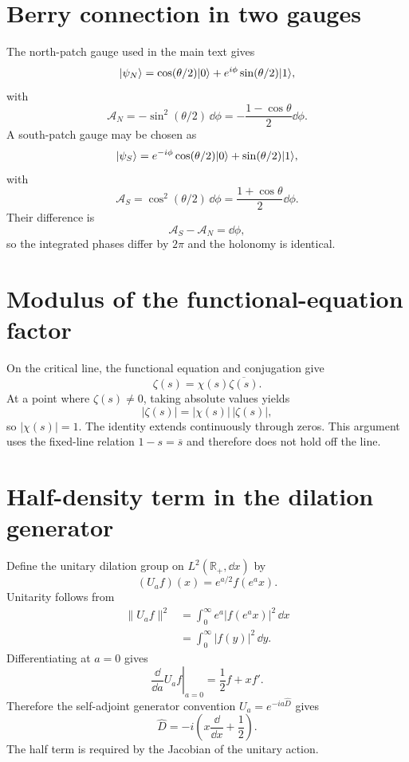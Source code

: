\section{Berry connection in two gauges}
The north-patch gauge used in the main text gives
\begin{equation}
\lvert \psi_N\rangle
=\cos(\theta/2)\lvert 0\rangle+e^{i\phi}\sin(\theta/2)\lvert 1\rangle,
\end{equation}
with
\begin{equation}
\mathcal A_N=-\sin^2(\theta/2)\,\dd\phi
=-\frac{1-\cos\theta}{2}\dd\phi.
\end{equation}
A south-patch gauge may be chosen as
\begin{equation}
\lvert \psi_S\rangle=e^{-i\phi}\cos(\theta/2)\lvert 0\rangle+\sin(\theta/2)\lvert 1\rangle,
\end{equation}
with
\begin{equation}
\mathcal A_S=\cos^2(\theta/2)\,\dd\phi
=\frac{1+\cos\theta}{2}\dd\phi.
\end{equation}
Their difference is
\begin{equation}
\mathcal A_S-\mathcal A_N=\dd\phi,
\end{equation}
so the integrated phases differ by $2\pi$ and the holonomy is identical.

\section{Modulus of the functional-equation factor}
On the critical line, the functional equation and conjugation give
\begin{equation}
\zeta(s)=\chi(s)\overline{\zeta(s)}.
\end{equation}
At a point where $\zeta(s)\neq0$, taking absolute values yields
\begin{equation}
|\zeta(s)|=|\chi(s)|\,|\zeta(s)|,
\end{equation}
so $|\chi(s)|=1$. The identity extends continuously through zeros. This argument uses the fixed-line relation $1-s=\overline s$ and therefore does not hold off the line.

\section{Half-density term in the dilation generator}
Define the unitary dilation group on $L^2(\mathbb R_+,\dd x)$ by
\begin{equation}
(U_a f)(x)=e^{a/2}f(e^a x).
\end{equation}
Unitarity follows from
\begin{align}
\|U_a f\|^2
&=\int_0^\infty e^a|f(e^a x)|^2\,\dd x\\
&=\int_0^\infty |f(y)|^2\,\dd y.
\end{align}
Differentiating at $a=0$ gives
\begin{equation}
\left.\frac{\dd}{\dd a}U_a f\right|_{a=0}
=\frac12 f+x f'.
\end{equation}
Therefore the self-adjoint generator convention $U_a=e^{-ia\widehat D}$ gives
\begin{equation}
\widehat D=-i\left(x\frac{\dd}{\dd x}+\frac12\right).
\end{equation}
The half term is required by the Jacobian of the unitary action.
